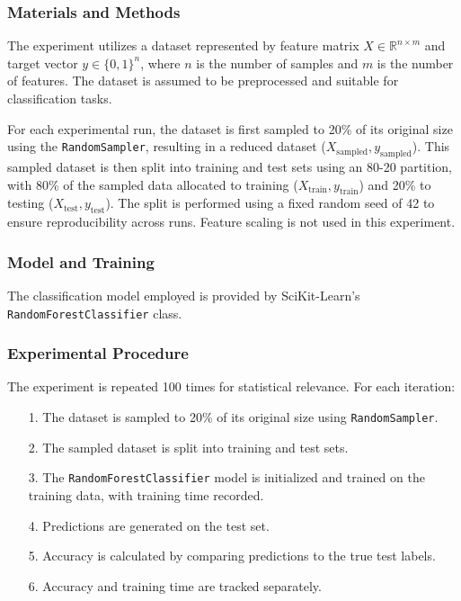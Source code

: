 \documentclass{article}
\theoremstyle{plain}
\theoremstyle{definition}
\theoremstyle{remark}
\begin{document}
\subsubsection{Materials and Methods}

The experiment utilizes a dataset represented by feature matrix $ X \in \mathbb{R}^{n \times m} $ and target vector $ y \in \{0, 1\}^n $, where $ n $ is the number of samples and $ m $ is the number of features. The dataset is assumed to be preprocessed and suitable for classification tasks.

For each experimental run, the dataset is first sampled to 20\% of its original size using the \texttt{RandomSampler}, resulting in a reduced dataset ($ X_{\text{sampled}}, y_{\text{sampled}} $). This sampled dataset is then split into training and test sets using an 80-20 partition, with 80\% of the sampled data allocated to training ($ X_{\text{train}}, y_{\text{train}} $) and 20\% to testing ($ X_{\text{test}}, y_{\text{test}} $). The split is performed using a fixed random seed of 42 to ensure reproducibility across runs. Feature scaling is not used in this experiment.

\subsubsection{Model and Training}

The classification model employed is provided by SciKit-Learn's \texttt{RandomForestClassifier} class.

\subsubsection{Experimental Procedure}

The experiment is repeated 100 times for statistical relevance. For each iteration:

\begin{itemize}
	\item [1.] The dataset is sampled to 20\% of its original size using \texttt{RandomSampler}.
	\item [2.] The sampled dataset is split into training and test sets.
	\item [3.] The \texttt{RandomForestClassifier} model is initialized and trained on the training data, with training time recorded.
	\item [4.] Predictions are generated on the test set.
	\item [5.] Accuracy is calculated by comparing predictions to the true test labels.
	\item [6.] Accuracy and training time are tracked separately.
\end{itemize}
\end{document}
